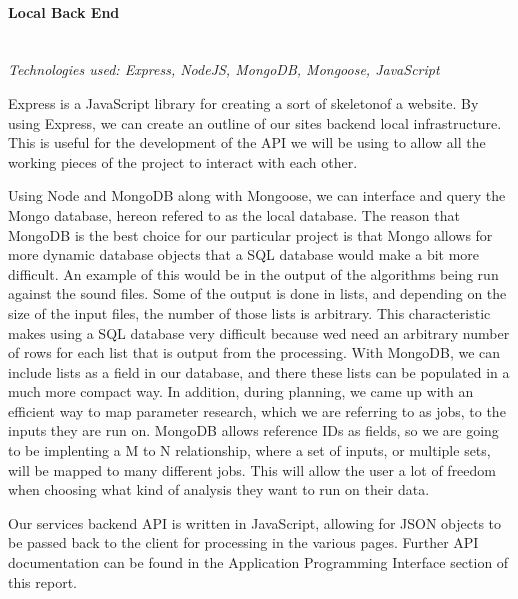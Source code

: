 \paragraph{Local Back End} \mbox{}\\
\textit{Technologies used: Express, NodeJS, MongoDB, Mongoose, JavaScript}\par
Express is a JavaScript library for creating a sort of \textquotesingle skeleton\textquotesingle  of a website. By using Express, we can create an outline of our site\textquotesingle s backend local infrastructure. This is useful for the development of the API we will be using to allow all the working pieces of the project to interact with each other.\par
Using Node and MongoDB along with Mongoose, we can interface and query the Mongo database, hereon refered to as the local database. The reason that MongoDB is the best choice for our particular project is that Mongo allows for more dynamic database objects that a SQL database would make a bit more difficult. An example of this would be in the output of the algorithms being run against the sound files. Some of the output is done in lists, and depending on the size of the input files, the number of those lists is arbitrary. This characteristic makes using a SQL database very difficult because we\textquotesingle d need an arbitrary number of rows for each list that is output from the processing. With MongoDB, we can include lists as a field in our database, and there these lists can be populated in a much more compact way. In addition, during planning, we came up with an efficient way to map parameter research, which we are referring to as jobs, to the inputs they are run on. MongoDB allows reference IDs as fields, so we are going to be implenting a M to N relationship, where a set of inputs, or multiple sets, will be mapped to many different jobs. This will allow the user a lot of freedom when choosing what kind of analysis they want to run on their data.\par
Our service\textquotesingle s backend API is written in JavaScript, allowing for JSON objects to be passed back to the client for processing in the various pages. Further API documentation can be found in the Application Programming Interface section of this report.

